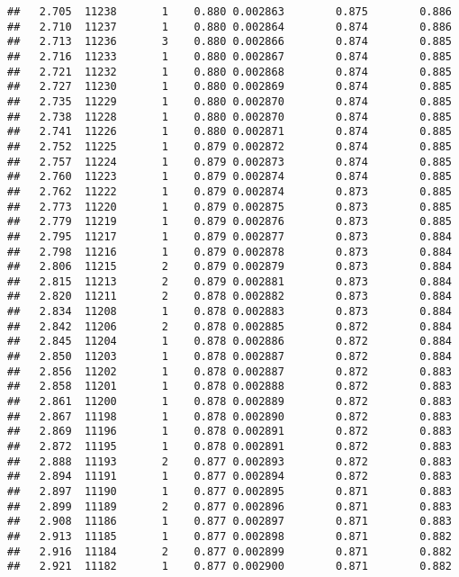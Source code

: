 \documentclass[
]{book}
\begin{document}
\begin{verbatim}
##   2.705  11238       1    0.880 0.002863        0.875        0.886
##   2.710  11237       1    0.880 0.002864        0.874        0.886
##   2.713  11236       3    0.880 0.002866        0.874        0.885
##   2.716  11233       1    0.880 0.002867        0.874        0.885
##   2.721  11232       1    0.880 0.002868        0.874        0.885
##   2.727  11230       1    0.880 0.002869        0.874        0.885
##   2.735  11229       1    0.880 0.002870        0.874        0.885
##   2.738  11228       1    0.880 0.002870        0.874        0.885
##   2.741  11226       1    0.880 0.002871        0.874        0.885
##   2.752  11225       1    0.879 0.002872        0.874        0.885
##   2.757  11224       1    0.879 0.002873        0.874        0.885
##   2.760  11223       1    0.879 0.002874        0.874        0.885
##   2.762  11222       1    0.879 0.002874        0.873        0.885
##   2.773  11220       1    0.879 0.002875        0.873        0.885
##   2.779  11219       1    0.879 0.002876        0.873        0.885
##   2.795  11217       1    0.879 0.002877        0.873        0.884
##   2.798  11216       1    0.879 0.002878        0.873        0.884
##   2.806  11215       2    0.879 0.002879        0.873        0.884
##   2.815  11213       2    0.879 0.002881        0.873        0.884
##   2.820  11211       2    0.878 0.002882        0.873        0.884
##   2.834  11208       1    0.878 0.002883        0.873        0.884
##   2.842  11206       2    0.878 0.002885        0.872        0.884
##   2.845  11204       1    0.878 0.002886        0.872        0.884
##   2.850  11203       1    0.878 0.002887        0.872        0.884
##   2.856  11202       1    0.878 0.002887        0.872        0.883
##   2.858  11201       1    0.878 0.002888        0.872        0.883
##   2.861  11200       1    0.878 0.002889        0.872        0.883
##   2.867  11198       1    0.878 0.002890        0.872        0.883
##   2.869  11196       1    0.878 0.002891        0.872        0.883
##   2.872  11195       1    0.878 0.002891        0.872        0.883
##   2.888  11193       2    0.877 0.002893        0.872        0.883
##   2.894  11191       1    0.877 0.002894        0.872        0.883
##   2.897  11190       1    0.877 0.002895        0.871        0.883
##   2.899  11189       2    0.877 0.002896        0.871        0.883
##   2.908  11186       1    0.877 0.002897        0.871        0.883
##   2.913  11185       1    0.877 0.002898        0.871        0.882
##   2.916  11184       2    0.877 0.002899        0.871        0.882
##   2.921  11182       1    0.877 0.002900        0.871        0.882

\end{verbatim}
\end{document}
